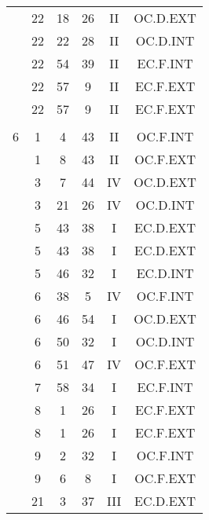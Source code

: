\documentclass[12pt, a4paper]{article}
\begin{document}
\begin{multicols}{3}
{\begin{tabular}{c c c c c c}
	 	 	 	 & 22 & 18 & 26 & II & OC.D.EXT\\%
	 	 	 	 & 22 & 22 & 28 & II & OC.D.INT\\%
	 	 	 	 & 22 & 54 & 39 & II & EC.F.INT\\%
	 	 	 	 & 22 & 57 & 9 & II & EC.F.EXT\\%
	 	 	 	 & 22 & 57 & 9 & II & EC.F.EXT\\%
	 	 	 	 & & & & & \\%
	 	 	 	6 & 1 & 4 & 43 & II & OC.F.INT\\%
	 	 	 	 & 1 & 8 & 43 & II & OC.F.EXT\\%
	 	 	 	 & 3 & 7 & 44 & IV & OC.D.EXT\\%
	 	 	 	 & 3 & 21 & 26 & IV & OC.D.INT\\%
	 	 	 	 & 5 & 43 & 38 & I & EC.D.EXT\\%
	 	 	 	 & 5 & 43 & 38 & I & EC.D.EXT\\%
	 	 	 	 & 5 & 46 & 32 & I & EC.D.INT\\%
	 	 	 	 & 6 & 38 & 5 & IV & OC.F.INT\\%
	 	 	 	 & 6 & 46 & 54 & I & OC.D.EXT\\%
	 	 	 	 & 6 & 50 & 32 & I & OC.D.INT\\%
	 	 	 	 & 6 & 51 & 47 & IV & OC.F.EXT\\%
	 	 	 	 & 7 & 58 & 34 & I & EC.F.INT\\%
	 	 	 	 & 8 & 1 & 26 & I & EC.F.EXT\\%
	 	 	 	 & 8 & 1 & 26 & I & EC.F.EXT\\%
	 	 	 	 & 9 & 2 & 32 & I & OC.F.INT\\%
	 	 	 	 & 9 & 6 & 8 & I & OC.F.EXT\\%
	 	 	 	 & 21 & 3 & 37 & III & EC.D.EXT\\%

\end{tabular}}
\end{multicols}
\end{document}
